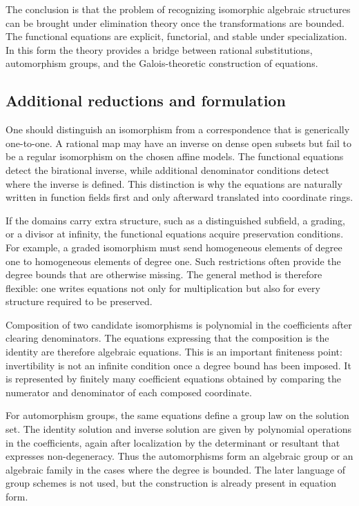 \documentclass[11pt]{article}
\begin{document}
The conclusion is that the problem of recognizing isomorphic algebraic structures can be brought
under elimination theory once the transformations are bounded. The functional equations are
explicit, functorial, and stable under specialization. In this form the theory provides a bridge
between rational substitutions, automorphism groups, and the Galois-theoretic construction of
equations.


\subsection{Additional reductions and formulation}

One should distinguish an isomorphism from a correspondence that is generically one-to-one. A
rational map may have an inverse on dense open subsets but fail to be a regular isomorphism on the
chosen affine models. The functional equations detect the birational inverse, while additional
denominator conditions detect where the inverse is defined. This distinction is why the equations
are naturally written in function fields first and only afterward translated into coordinate rings.

If the domains carry extra structure, such as a distinguished subfield, a grading, or a divisor at
infinity, the functional equations acquire preservation conditions. For example, a graded
isomorphism must send homogeneous elements of degree one to homogeneous elements of degree one. Such
restrictions often provide the degree bounds that are otherwise missing. The general method is
therefore flexible: one writes equations not only for multiplication but also for every structure
required to be preserved.

Composition of two candidate isomorphisms is polynomial in the coefficients after clearing
denominators. The equations expressing that the composition is the identity are therefore algebraic
equations. This is an important finiteness point: invertibility is not an infinite condition once a
degree bound has been imposed. It is represented by finitely many coefficient equations obtained by
comparing the numerator and denominator of each composed coordinate.

For automorphism groups, the same equations define a group law on the solution set. The identity
solution and inverse solution are given by polynomial operations in the coefficients, again after
localization by the determinant or resultant that expresses non-degeneracy. Thus the automorphisms
form an algebraic group or an algebraic family in the cases where the degree is bounded. The later
language of group schemes is not used, but the construction is already present in equation form.
\end{document}
